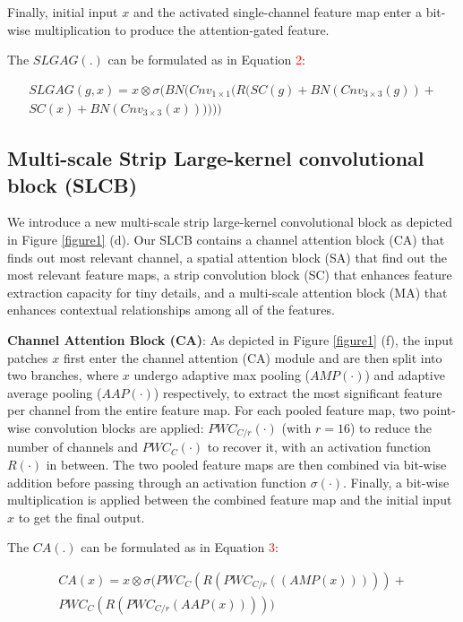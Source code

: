 \documentclass[runningheads]{llncs}
\begin{document}
Finally, initial input $x$ and the activated single-channel feature map enter a bit-wise multiplication to produce the attention-gated feature.

The $SLGAG(.)$ can be formulated as in Equation \textcolor{red}{2}: 
\begin{scriptsize}
\begin{align}\nonumber
	SLGAG(g,x) = x \otimes \sigma(BN(Cnv_{1\times 1}(R(SC(g) + BN(Cnv_{3\times 3}(g)) + \\SC(x) + BN(Cnv_{3\times 3}(x))))))
\end{align}
\end{scriptsize}

\subsection{Multi-scale Strip Large-kernel convolutional block (SLCB)}

We introduce a new multi-scale strip large-kernel convolutional block as depicted in Figure \textcolor{red}{\ref{figure1}} (d). Our SLCB contains a channel attention block (CA) that finds out most relevant channel, a spatial attention block (SA) that find out the most relevant feature maps, a strip convolution block (SC) that enhances feature extraction capacity for tiny details, and a multi-scale attention block (MA) that enhances contextual relationships among all of the features.

\textbf{Channel Attention Block (CA)}\cite{woo2018cbam}: As depicted in Figure \textcolor{red}{\ref{figure1}} (f), the input patches $x$ first enter the channel attention (CA) module and are then split into two branches, where $x$ undergo adaptive max pooling\cite{he2014spatial} ($AMP(\cdot)$) and adaptive average pooling ($AAP(\cdot)$)\cite{he2014spatial} respectively, to extract the most significant feature per channel from the entire feature map. For each pooled feature map, two point-wise convolution blocks\cite{lin2013network} are applied: $PWC_{C/r}(\cdot)$ (with $r=16$) to reduce the number of channels and $PWC_C(\cdot)$ to recover it, with an activation function $R(\cdot)$ in between. The two pooled feature maps are then combined via bit-wise addition before passing through an activation function $\sigma(\cdot)$. Finally, a bit-wise multiplication is applied between the combined feature map and the initial input $x$ to get the final output.

The $CA(.)$ can be formulated as in Equation \textcolor{red}{3}:
\begin{scriptsize}   
\begin{align}
  CA(x) = x \otimes \sigma(PWC_{C}(R(PWC_{C/r}((AMP(x))))) + \nonumber
  \\PWC_{C}(R(PWC_{C/r}(AAP(x)))))
\end{align}
\end{scriptsize}
\end{document}
